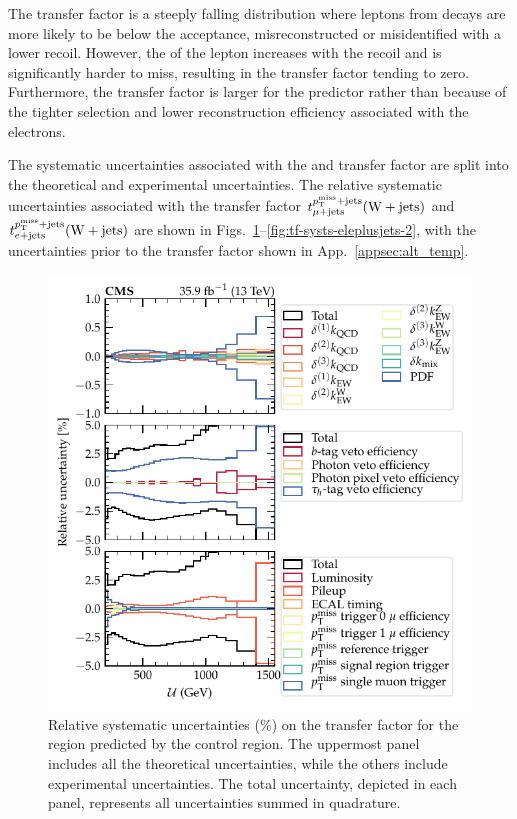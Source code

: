The transfer factor is a steeply falling distribution where leptons from \PW decays are more likely to be below the \pt acceptance, misreconstructed or misidentified with a lower recoil. However, the \pt of the lepton increases with the recoil and is significantly harder to miss, resulting in the transfer factor tending to zero. Furthermore, the transfer factor is larger for the \eleplusjets predictor rather than \muplusjets because of the tighter selection and lower reconstruction efficiency associated with the electrons.

The systematic uncertainties associated with the \muplusjets and \eleplusjets transfer factor are split into the theoretical and experimental uncertainties. The relative systematic uncertainties associated with the transfer factor $t_{\mu+\mathrm{jets}}^{p_{\text{T}}^{\mathrm{miss}}+\mathrm{jets}}({\mathrm{W}+\mathrm{jets}})$ and $t_{e+\mathrm{jets}}^{p_{\text{T}}^{\mathrm{miss}}+\mathrm{jets}}({\mathrm{W}+\mathrm{jets}})$ are shown in Figs.~\ref{fig:tf-systs-muplusjets-1}--\ref{fig:tf-systs-eleplusjets-2}, with the uncertainties prior to the transfer factor shown in App.~\ref{appsec:alt_temp}.
%
\begin{figure}
    \centering
    \includegraphics{chapters/042_backgrounds/images/tf_wj_mu_met_systs1.pdf}
    \caption[Theoretical uncertainty on the transfer factors]{
        Relative systematic uncertainties (\%) on the \IWj transfer factor for the \metplusjets region predicted by the \muplusjets control region. The uppermost panel includes all the theoretical uncertainties, while the others include experimental uncertainties. The total uncertainty, depicted in each panel, represents all uncertainties summed in quadrature.
    }
    \label{fig:tf-systs-muplusjets-1}
\end{figure}
